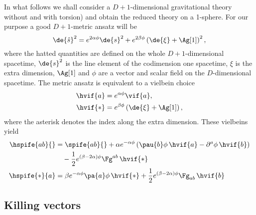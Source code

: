 \documentclass[aps,prd,12pt,superscriptaddress,showpacs,showkeys,reprint]{revtex4-1}
\begin{document}
In what follows we shall consider a $D+1$-dimensional gravitational theory without and with torsion) and obtain the reduced theory on a 1-sphere. For our purpose a good $D+1$-metric ansatz will be~\cite{Duff:1986hr,PopeKK}
\begin{equation}
  \de{\hat{s}}^2 = e^{2\alpha\phi} \de{s}^2 + e^{2 \beta \phi} \left( \de{\xi} + \Ag[1] \right)^2,
  \label{KKansatz}
\end{equation}
where the hatted quantities are defined on the whole $D+1$-dimensional spacetime, $\de{s}^2$ is the line element of the codimension one spacetime, $\xi$ is the extra dimension, $\Ag[1]$ and $\phi$ are a vector and scalar field on the $D$-dimensional spacetime. The metric ansatz is equivalent to a vielbein choice
\begin{equation}
    \label{vif-anz}
  \begin{split}
    \hvif{a} &= e^{\alpha \phi} \vif{a}, \\
    \hvif{*} &= e^{\beta \phi} \left( \de{\xi} + \Ag[1] \right),
  \end{split}
\end{equation}
where the asterisk denotes the index along the extra dimension. These vielbeins yield 
\begin{equation}
  \begin{split}
    \hspife{ab}{} &= \spife{ab}{} + \alpha e^{-\alpha \phi} \left( \pau{b} \phi \, \hvif{a} - \partial^{a} \phi \, \hvif{b} \right) \\
    & \quad - \frac{1}{2} e^{(\beta - 2\alpha) \phi} \Fg^{a b} \, \hvif{*}
    \\
    \hspife{*}{a} &= \beta e^{-\alpha \phi} \pa{a} \phi \, \hvif{*} + \frac{1}{2} e^{(\beta - 2\alpha) \phi} \Fg_{a b} \, \hvif{b} 
  \end{split}
\end{equation}

\subsection*{Killing vectors}
\end{document}
